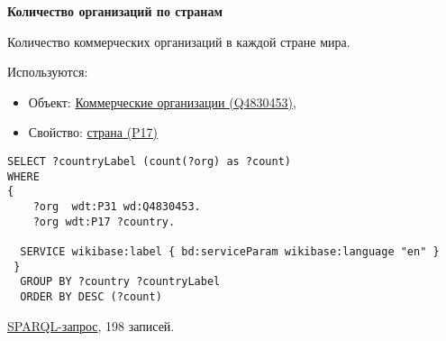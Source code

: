 \textbf{Количество организаций по странам}

Количество коммерческих организаций в каждой стране мира. 

Используются:
\begin{itemize}
    \item Объект: \href{https://www.wikidata.org/wiki/Q4830453}{Коммерческие организации (Q4830453)},
    \item Свойство: \href{https://www.wikidata.org/wiki/Property:P17}{страна (P17)}
\end{itemize}

\begin{lstlisting}[language=SPARQL]
SELECT ?countryLabel (count(?org) as ?count)
WHERE
{
    ?org  wdt:P31 wd:Q4830453.
    ?org wdt:P17 ?country.

  SERVICE wikibase:label { bd:serviceParam wikibase:language "en" }
 }
  GROUP BY ?country ?countryLabel
  ORDER BY DESC (?count)
\end{lstlisting}

\href{https://query.wikidata.org/#SELECT%20%3FcountryLabel%20%28count%28%3Forg%29%20as%20%3Fcount%29%0AWHERE%0A%7B%0A%20%20%20%20%3Forg%20%20wdt%3AP31%20wd%3AQ4830453.%0A%20%20%20%20%3Forg%20wdt%3AP17%20%3Fcountry.%0A%0A%20%20SERVICE%20wikibase%3Alabel%20%7B%20bd%3AserviceParam%20wikibase%3Alanguage%20%22en%22%20%7D%0A%20%7D%0A%20%20GROUP%20BY%20%3Fcountry%20%3FcountryLabel%0A%20%20ORDER%20BY%20DESC%20%28%3Fcount%29%0A}{SPARQL-запрос}, 198 записей.
